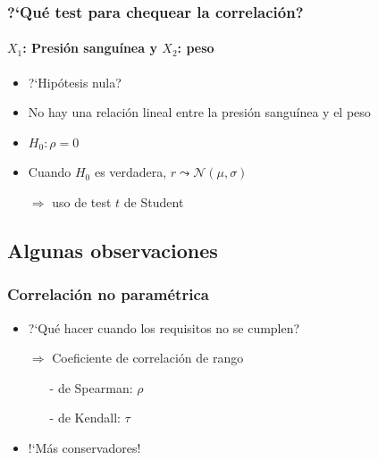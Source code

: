 \documentclass[mathserif]{beamer}
\begin{document}
\begin{frame}[label=corrtest]
   \frametitle{?`Qu\'e test para chequear la correlaci\'on?}
   \framesubtitle{$X_1$: Presi\'on sangu\'inea y $X_2$: peso}
    \begin{itemize}[<+- | visible@+-| handout:1>]
      \item ?`Hip\'otesis nula?
      \item No hay una relaci\'on lineal entre la presi\'on sangu\'inea y el peso
      \item $H_0: \rho=0$
      \item Cuando $H_0$ es verdadera, $r\leadsto\mathcal{N}(\mu,\sigma)$
      \item[] $\Rightarrow$ uso de test $t$ de Student
   \end{itemize}
\end{frame}%


\subsection[Observaciones]{Algunas observaciones}

\begin{frame}[label=corrnopar]
   \frametitle{Correlaci\'on no param\'etrica}
    \begin{itemize}[<+-| handout:1>]
      \item ?`Qu\'e hacer cuando los requisitos no se cumplen?
      \medskip
      \item[$\Rightarrow$] Coeficiente de correlaci\'on de rango
         \begin{itemize} 
            \item[-] de Spearman: $\rho$
            \item[-] de Kendall: $\tau$
         \end{itemize}
      \item !`M\'as conservadores!
   \end{itemize}
\end{frame}%
\end{document}
